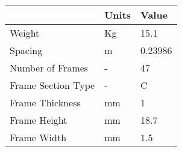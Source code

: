 \begin{tabular}{lll}
& Units & Value \\ 
\hline 
Weight & Kg & 15.1 \\ 
Spacing & m & 0.23986 \\ 
Number of Frames & - & 47 \\ 
Frame Section Type & - & C \\ 
Frame Thickness & mm & 1 \\ 
Frame Height & mm & 18.7 \\ 
Frame Width & mm & 1.5 \\ 
\hline 
\end{tabular}